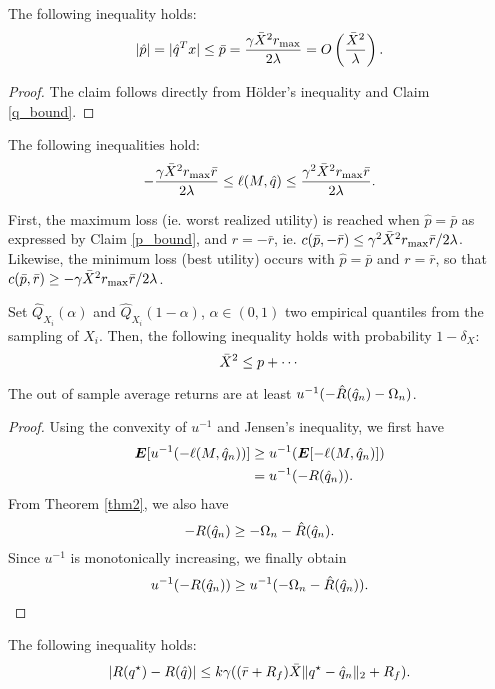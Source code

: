 \begin{claim}
  \label{p_bound}
  The following inequality holds:
  \[
    |\hat p| = |\hat q^Tx| \leq \bar p =\frac{\gamma\bar X^2 r_{\max}}{2\lambda} =
    O\left(\frac{\bar X^2}{\lambda}\right).
  \]
\end{claim}
\begin{proof}
  The claim follows directly from Hölder's inequality and Claim \ref{q_bound}.
\end{proof}

\begin{claim}
  \label{ell_bound}
  The following inequalities hold:
  \[
    -\frac{\gamma\bar X^2r_{\max}\bar r}{2\lambda} \leq \ell(M,\hat q) \leq \frac{\gamma^2
      \bar X^2 r_{\max} \bar r}{2\lambda}.
  \]
\end{claim}
First, the maximum loss (ie. worst realized utility) is reached when $\hat p=\bar p$ as
expressed by Claim \ref{p_bound}, and $r=-\bar r$, ie.
$c(\bar p,-\bar r) \leq \gamma^2\bar X^2 r_{\max}\bar r/2\lambda$. Likewise, the minimum
loss (best utility) occurs with $\hat p  = \bar p$ and $r = \bar r$, so that $c(\bar p,
\bar r) \geq -\gamma\bar X^2r_{\max}\bar r/2\lambda$. 

\begin{claim}
  Set $\hat Q_{X_i}(\alpha)$ and $\hat Q_{X_i}(1-\alpha)$, $\alpha\in(0,1)$ two empirical
  quantiles from the sampling of $X_i$. Then, the following inequality holds with
  probability $1-\delta_X$:
  \[
    \bar X^2 \leq p + \cdots
  \]
\end{claim}

\begin{claim}
  \label{out_of_sample_claim}
  The out of sample average returns are at least $u^{-1}(-\hat R({\hat q}_n) - \Omega_n)$.
\end{claim}
\begin{proof}
  Using the convexity of $u^{-1}$ and Jensen's inequality, we first have
  \begin{align*}
    \bm E[u^{-1}(-\ell(M,{\hat q}_n))] &\geq u^{-1}(\bm E[-\ell(M,{\hat q}_n)])\\
                                &=u^{-1}(-R({\hat q}_n)).
  \end{align*}
  From Theorem \ref{thm2}, we also have 
  \[
    -R({\hat q}_n) \geq -\Omega_n - \hat R({\hat q}_n).
  \]
  Since $u^{-1}$ is monotonically increasing, we finally obtain
  \[
    u^{-1}(-R({\hat q}_n)) \geq u^{-1}(-\Omega_n - \hat R({\hat q}_n)).\qedhere
  \]
\end{proof}


\begin{claim}
\label{claim1}
 The following inequality holds:
\[
  |R({q^\star}) - R(\hat q)| \leq k\gamma((\bar r +R_f)\bar X\|{q^\star} - {\hat q}_n\|_2 + R_f).
\]
\end{claim}

